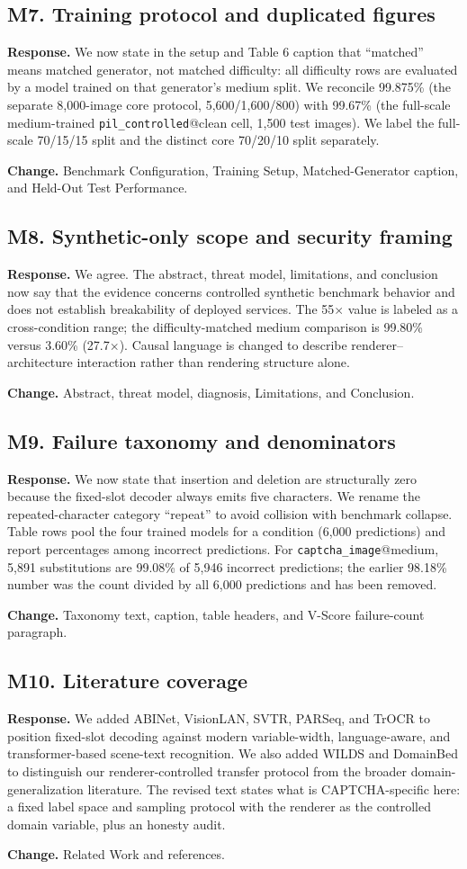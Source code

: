 \documentclass[11pt]{article}
\newcommand{\response}[1]{\par\noindent\textbf{Response.} #1\par}
\newcommand{\change}[1]{\par\noindent\textbf{Change.} #1\par}
\begin{document}
\subsection*{M7. Training protocol and duplicated figures}
\response{We now state in the setup and Table 6 caption that ``matched'' means matched generator, not matched difficulty: all difficulty rows are evaluated by a model trained on that generator's medium split. We reconcile 99.875\% (the separate 8,000-image core protocol, 5,600/1,600/800) with 99.67\% (the full-scale medium-trained \texttt{pil\_controlled}@clean cell, 1,500 test images). We label the full-scale 70/15/15 split and the distinct core 70/20/10 split separately.}
\change{Benchmark Configuration, Training Setup, Matched-Generator caption, and Held-Out Test Performance.}

\subsection*{M8. Synthetic-only scope and security framing}
\response{We agree. The abstract, threat model, limitations, and conclusion now say that the evidence concerns controlled synthetic benchmark behavior and does not establish breakability of deployed services. The 55$\times$ value is labeled as a cross-condition range; the difficulty-matched medium comparison is 99.80\% versus 3.60\% (27.7$\times$). Causal language is changed to describe renderer--architecture interaction rather than rendering structure alone.}
\change{Abstract, threat model, diagnosis, Limitations, and Conclusion.}

\subsection*{M9. Failure taxonomy and denominators}
\response{We now state that insertion and deletion are structurally zero because the fixed-slot decoder always emits five characters. We rename the repeated-character category ``repeat'' to avoid collision with benchmark collapse. Table rows pool the four trained models for a condition (6,000 predictions) and report percentages among incorrect predictions. For \texttt{captcha\_image}@medium, 5,891 substitutions are 99.08\% of 5,946 incorrect predictions; the earlier 98.18\% number was the count divided by all 6,000 predictions and has been removed.}
\change{Taxonomy text, caption, table headers, and V-Score failure-count paragraph.}

\subsection*{M10. Literature coverage}
\response{We added ABINet, VisionLAN, SVTR, PARSeq, and TrOCR to position fixed-slot decoding against modern variable-width, language-aware, and transformer-based scene-text recognition. We also added WILDS and DomainBed to distinguish our renderer-controlled transfer protocol from the broader domain-generalization literature. The revised text states what is CAPTCHA-specific here: a fixed label space and sampling protocol with the renderer as the controlled domain variable, plus an honesty audit.}
\change{Related Work and references.}
\end{document}
